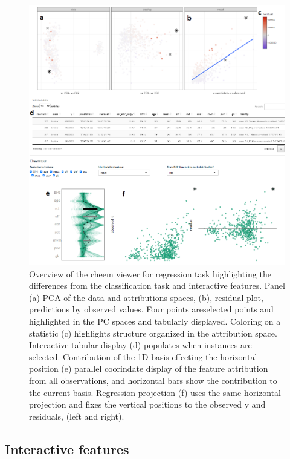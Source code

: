 \documentclass[
]{article}
\begin{document}
\begin{figure}

{\centering \includegraphics[width=1\linewidth]{./figures/app_regression_interactions} 

}

\caption{Overview of the cheem viewer for regression task highlighting the differences from the classification task and interactive features. Panel (a) PCA of the data and attributions spaces, (b), residual plot, predictions by observed values. Four points areselected points and highlighted in the PC spaces and tabularly displayed. Coloring on a statistic (c) highlights structure organized in the attribution space. Interactive tabular display (d) populates when instances are selected. Contribution of the 1D basis effecting the horizontal position (e) parallel coorindate display of the feature attribution from all observations, and horizontal bars show the contribution to the current basis. Regression projection (f) uses the same horizontal projection and fixes the vertical positions to the observed y and residuals, (left and right).}\label{fig:regressioncase}
\end{figure}

\hypertarget{interactive-features}{%
\subsection{Interactive features}\label{interactive-features}}
\end{document}
